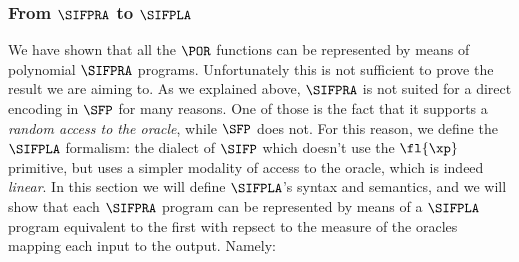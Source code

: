 \begin{comment}
Since the implementation of $\POR$ is $\SIFP$ is $\omega$-conservative, we should state a similar result for the program $P$ obtained with the procedure described in Lemma \ref{lemma:portosifp}. Formally:

\begin{lemma}
\label{lemma:sifpmap}
$\forall f \in \POR. \forall \vec x \in \SS. \forall \omega \in \Os. \exists g\in \SS^\Nat. \exists k \in \Nat. \forall j \in \Nat. j < k \to \forall \omega' \omega'(g(j))\neq\omega(g(j))\to \LL(f)(\vec x, \omega)\neq \LL(f)(\vec x, \omega')$. Moreover the size of the function's graph is polynomial.
\end{lemma}
\begin{proof}
In Lemma \ref{lemma:portosifp}, we have proved that the translation $\LL(\cdot)$ preserves the behaviour of the program, fixed $\omega$, so the result is a consequence of Lemma \ref{lemma:pormap}.
\end{proof}
\end{comment}


























\subsubsection{From $\SIFPRA$ to $\SIFPLA$}
\label{subsub:sifpratosifpla}

We have shown that all the $\POR$ functions can be represented by means of
polynomial $\SIFPRA$ programs. Unfortunately this is not sufficient to prove the
result we are aiming to. As we explained above, $\SIFPRA$ is not suited
for a direct encoding in $\SFP$ for many reasons. One of those is the
fact that it supports a \emph{random access to the oracle}, while $\SFP$ does not.
For this reason, we define the $\SIFPLA$ formalism: the dialect of
$\SIFP$ which doesn't use the $\fl{\xp}$ primitive, but uses a simpler modality
of access to the oracle, which is indeed \emph{linear}.
%
In this section we will define $\SIFPLA$'s syntax and semantics, and we
will show that each $\SIFPRA$ program can be represented by means of a
$\SIFPLA$ program equivalent to the first with repsect to
the measure of the oracles mapping each input to the output. Namely:

